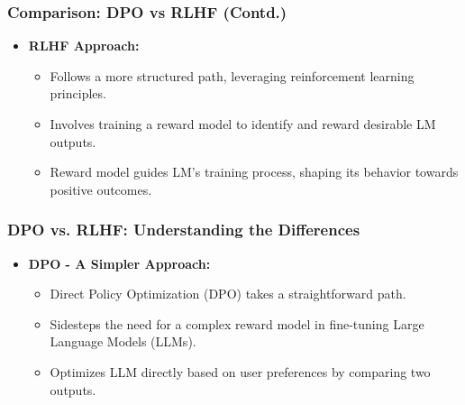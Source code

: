 \begin{frame}[fragile]\frametitle{Comparison: DPO vs RLHF (Contd.)}
  \begin{itemize}
    \item \textbf{RLHF Approach:}
      \begin{itemize}
        \item Follows a more structured path, leveraging reinforcement learning principles.
        \item Involves training a reward model to identify and reward desirable LM outputs.
        \item Reward model guides LM's training process, shaping its behavior towards positive outcomes.
      \end{itemize}
  \end{itemize}
\end{frame}


\begin{frame}[fragile]\frametitle{DPO vs. RLHF: Understanding the Differences}
  \begin{itemize}
    \item \textbf{DPO - A Simpler Approach:}
      \begin{itemize}
        \item Direct Policy Optimization (DPO) takes a straightforward path.
        \item Sidesteps the need for a complex reward model in fine-tuning Large Language Models (LLMs).
        \item Optimizes LLM directly based on user preferences by comparing two outputs.
      \end{itemize}
  \end{itemize}
\end{frame}

